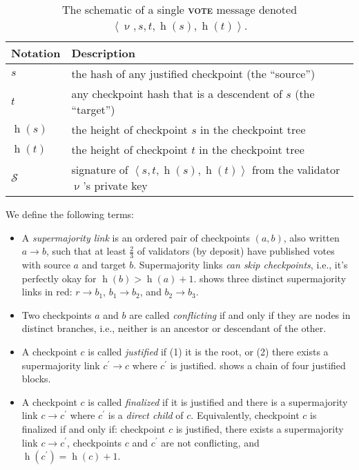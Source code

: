 \documentclass[12pt]{article}
\newcommand{\signature}{\ensuremath{\mathcal{S}}\xspace}
\newcommand{\h}{\operatorname{h}\xspace}
\newcommand{\msgVOTE}{\textbf{\textsc{vote}}\xspace}
\begin{document}
\begin{table}[bth]
\centering

   \begin{tabular}{l l}
	\toprule
	\textbf{Notation} & \textbf{Description} \\
	\midrule
	$s$ & the hash of any justified checkpoint (the ``source'') \\
	$t$ & any checkpoint hash that is a descendent of  $s$ (the ``target'') \\
	$\h(s)$ & the height of checkpoint $s$ in the checkpoint tree \\
	$\h(t)$ & the height of checkpoint $t$ in the checkpoint tree \\
	\signature & signature of $\left\langle s, t, \h(s), \h(t) \right\rangle$ from the validator $\upnu$'s private key \\
	\bottomrule
	\end{tabular}


\vspace{0.15in}
\caption{The schematic of a single \msgVOTE message denoted $\left\langle \upnu, s, t, \h(s), \h(t) \right\rangle$.}
\label{tbl:messages}
\end{table}



We define the following terms:
\begin{itemize}
\item A \emph{supermajority link} is an ordered pair of checkpoints $(a, b)$, also written $a \rightarrow b$, such that at least $\frac{2}{3}$ of validators (by deposit) have published votes with source $a$ and target $b$.  Supermajority links \emph{can skip checkpoints}, i.e., it's perfectly okay for $\h(b) > \h(a) + 1$.   shows three distinct supermajority links in red: $r \to b_1$, $b_1 \to b_2$, and $b_2 \to b_3$.

\item Two checkpoints $a$ and $b$ are called \emph{conflicting} if and only if they are nodes in distinct branches, i.e., neither is an ancestor or descendant of the other.

\item A checkpoint $c$ is called \emph{justified} if (1) it is the root, or (2) there exists a supermajority link $c^\prime \to c$ where $c^\prime$ is justified.   shows a chain of four justified blocks.

\item A checkpoint $c$ is called \emph{finalized} if it is justified and there is a supermajority link $c \to c^\prime$ where $c^\prime$ is a \emph{direct child} of $c$.  Equivalently, checkpoint $c$ is finalized if and only if: checkpoint $c$ is justified, there exists a supermajority link $c \to c^\prime$, checkpoints $c$ and $c^\prime$ are not conflicting, and $\h(c^\prime) = \h(c) + 1$.
\end{itemize}
\end{document}
